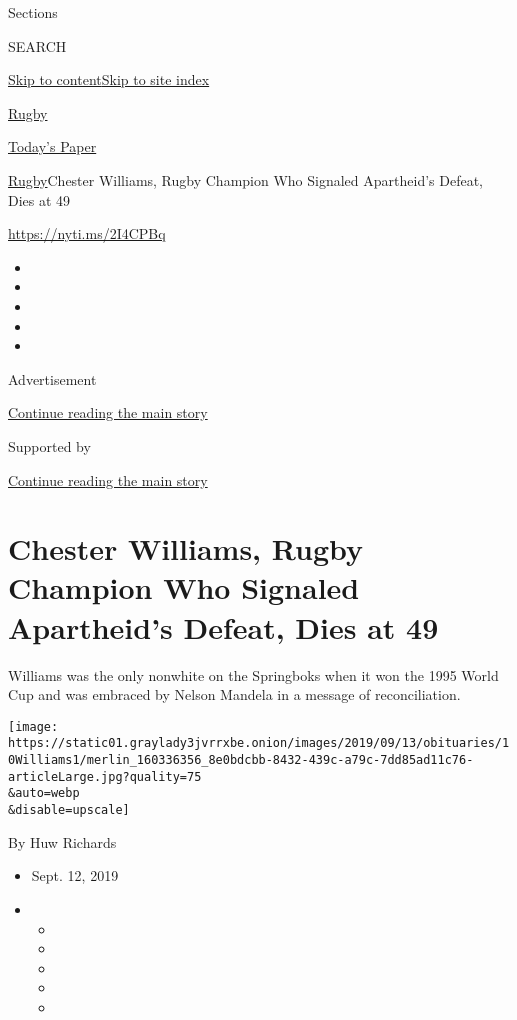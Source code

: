 Sections

SEARCH

\protect\hyperlink{site-content}{Skip to
content}\protect\hyperlink{site-index}{Skip to site index}

\href{https://www.nytimes3xbfgragh.onion/section/sports/rugby}{Rugby}

\href{https://myaccount.nytimes3xbfgragh.onion/auth/login?response_type=cookie\&client_id=vi}{}

\href{https://www.nytimes3xbfgragh.onion/section/todayspaper}{Today's
Paper}

\href{/section/sports/rugby}{Rugby}\textbar{}Chester Williams, Rugby
Champion Who Signaled Apartheid's Defeat, Dies at 49

\url{https://nyti.ms/2I4CPBq}

\begin{itemize}
\item
\item
\item
\item
\item
\end{itemize}

Advertisement

\protect\hyperlink{after-top}{Continue reading the main story}

Supported by

\protect\hyperlink{after-sponsor}{Continue reading the main story}

\hypertarget{chester-williams-rugby-champion-who-signaled-apartheids-defeat-dies-at-49}{%
\section{Chester Williams, Rugby Champion Who Signaled Apartheid's
Defeat, Dies at
49}\label{chester-williams-rugby-champion-who-signaled-apartheids-defeat-dies-at-49}}

Williams was the only nonwhite on the Springboks when it won the 1995
World Cup and was embraced by Nelson Mandela in a message of
reconciliation.

\texttt{[image: https://static01.graylady3jvrrxbe.onion/images/2019/09/13/obituaries/10Williams1/merlin\_160336356\_8e0bdcbb-8432-439c-a79c-7dd85ad11c76-articleLarge.jpg?quality=75\\\&auto=webp\\\&disable=upscale]}

By Huw Richards

\begin{itemize}
\item
  Sept. 12, 2019
\item
  \begin{itemize}
  \item
  \item
  \item
  \item
  \item
  \end{itemize}
\end{itemize}

